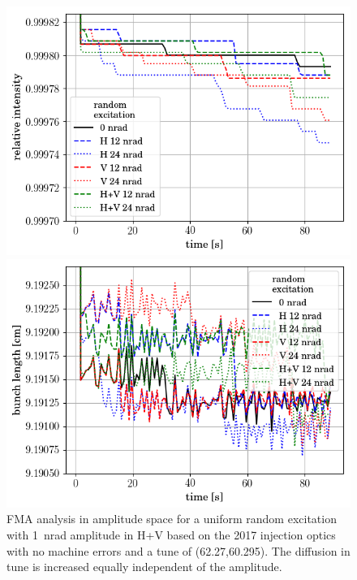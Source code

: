 \documentclass[%
 reprint,
 amsmath,amssymb,
 aps,
prstab,
]{revtex4-1}
\begin{document}
\begin{figure}[t]
\begin{minipage}[t]{0.49\linewidth}
	\end{minipage}	
	\caption{\label{fig:ran2017fmaamp} FMA analysis in amplitude space for a uniform random excitation with 1~nrad amplitude in H+V based on the 2017 injection optics with no machine errors and a tune of (62.27,60.295). The diffusion in tune is increased equally independent of the amplitude.}
	\begin{minipage}[t]{0.49\linewidth}
		\centering
		\includegraphics[width=1.0\linewidth]{2017injerra2b2u_ranadt_3_5um_intensity.png}
	\end{minipage}
	\begin{minipage}[t]{0.49\linewidth}
		\centering
		\includegraphics[width=1.0\linewidth]{2017injerra2b2u_ranadt_3_5um_sigm.png}

\end{minipage}
\end{figure}
\end{document}
